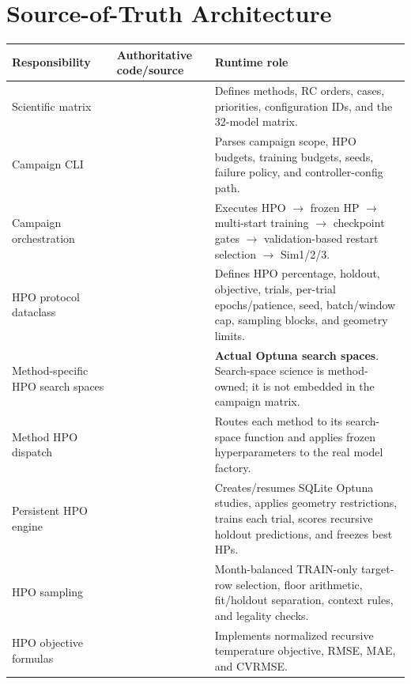 \documentclass[11pt]{article}
\begin{document}
\section{Source-of-Truth Architecture}
\begin{longtable}{L{0.23\textwidth}L{0.34\textwidth}L{0.36\textwidth}}
\toprule
\textbf{Responsibility} & \textbf{Authoritative code/source} & \textbf{Runtime role} \\
\midrule
\endhead
Scientific matrix &  & Defines methods, RC orders, cases, priorities, configuration IDs, and the 32-model matrix. \\
Campaign CLI &  & Parses campaign scope, HPO budgets, training budgets, seeds, failure policy, and controller-config path. \\
Campaign orchestration &  & Executes HPO $\rightarrow$ frozen HP $\rightarrow$ multi-start training $\rightarrow$ checkpoint gates $\rightarrow$ validation-based restart selection $\rightarrow$ Sim1/2/3. \\
HPO protocol dataclass &  & Defines HPO percentage, holdout, objective, trials, per-trial epochs/patience, seed, batch/window cap, sampling blocks, and geometry limits. \\
Method-specific HPO search spaces &  & \textbf{Actual Optuna search spaces}. Search-space science is method-owned; it is not embedded in the campaign matrix. \\
Method HPO dispatch &  & Routes each method to its search-space function and applies frozen hyperparameters to the real model factory. \\
Persistent HPO engine &  & Creates/resumes SQLite Optuna studies, applies geometry restrictions, trains each trial, scores recursive holdout predictions, and freezes best HPs. \\
HPO sampling &  & Month-balanced TRAIN-only target-row selection, floor arithmetic, fit/holdout separation, context rules, and legality checks. \\
HPO objective formulas &  & Implements normalized recursive temperature objective, RMSE, MAE, and CVRMSE. \\

\end{longtable}
\end{document}
